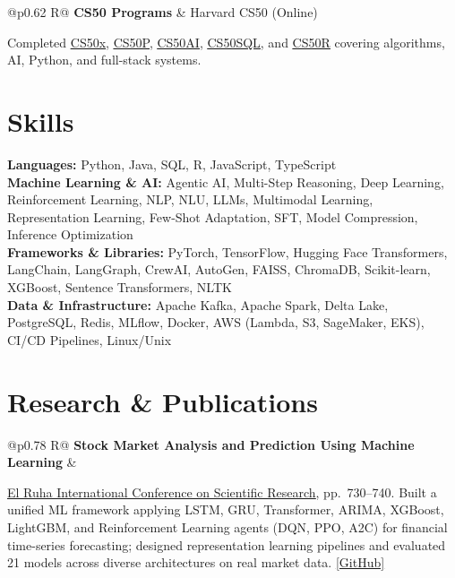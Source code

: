 \documentclass[a4paper,10pt]{article}
\newcommand{\ulink}[2]{\href{#1}{\uline{#2}}}
\newcommand{\subheading}[1]{{\color[HTML]{0A0A0A}\fontsize{12}{14}\selectfont\bfseries #1}}
\newcommand{\meta}[1]{{\color[HTML]{5C5C5C}\fontsize{10.5}{12.5}\selectfont #1}}
\begin{document}
\begin{tabularx}{\linewidth}{@{}p{0.62\linewidth} R@{}}
\subheading{CS50 Programs} & \meta{Harvard CS50 (Online)}
\end{tabularx}
\vspace{1pt}
{\color[HTML]{3A3A3A}\fontsize{11}{14}\selectfont Completed \ulink{https://cs50.harvard.edu/certificates/b14b78df-e05c-413e-a607-1dd27303053a}{CS50x}, \ulink{https://cs50.harvard.edu/certificates/32477052-9db4-49c4-a5a4-d7e58429ca2c}{CS50P}, \ulink{https://cs50.harvard.edu/certificates/9cdb4d4a-1250-4f8e-9fd7-191864e0f919}{CS50AI}, \ulink{https://cs50.harvard.edu/certificates/bc486f24-f085-4e61-8536-80940b97a1b9}{CS50SQL}, and \ulink{https://cs50.harvard.edu/certificates/666838e6-a053-4d82-b179-a60fe745fd84}{CS50R} covering algorithms, AI, Python, and full-stack systems.}

\vspace{2pt}

\section{Skills}
\vspace{5pt}
{\color[HTML]{0A0A0A}\fontsize{11}{14}\selectfont
\textbf{Languages:} Python, Java, SQL, R, JavaScript, TypeScript \\[2pt]
\textbf{Machine Learning \& AI:} Agentic AI, Multi-Step Reasoning, Deep Learning, Reinforcement Learning, NLP, NLU, LLMs, Multimodal Learning, Representation Learning, Few-Shot Adaptation, SFT, Model Compression, Inference Optimization \\[2pt]
\textbf{Frameworks \& Libraries:} PyTorch, TensorFlow, Hugging Face Transformers, LangChain, LangGraph, CrewAI, AutoGen, FAISS, ChromaDB, Scikit-learn, XGBoost, Sentence Transformers, NLTK \\[2pt]
\textbf{Data \& Infrastructure:} Apache Kafka, Apache Spark, Delta Lake, PostgreSQL, Redis, MLflow, Docker, AWS (Lambda, S3, SageMaker, EKS), CI/CD Pipelines, Linux/Unix}

\vspace{2pt}

\section{Research \& Publications}
\vspace{2pt}

\begin{tabularx}{\linewidth}{@{}p{0.78\linewidth} R@{}}
\subheading{Stock Market Analysis and Prediction Using Machine Learning} & \meta{2025}
\end{tabularx}
\vspace{1pt}
{\color[HTML]{0A0A0A}\fontsize{11}{14}\selectfont
\ulink{https://www.elruha.org/_files/ugd/614b1f_6b95e1b697bf452b9907ba46e0151c05.pdf\#page=774}{El Ruha International Conference on Scientific Research}, pp.\ 730--740. Built a unified ML framework applying LSTM, GRU, Transformer, ARIMA, XGBoost, LightGBM, and Reinforcement Learning agents (DQN, PPO, A2C) for financial time-series forecasting; designed representation learning pipelines and evaluated 21 models across diverse architectures on real market data. \ulink{https://github.com/su-jin1425/Set-Project}{[GitHub]}}
\end{document}
